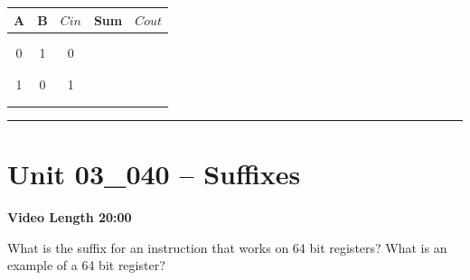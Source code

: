 \documentclass[letterpaper,12pt]{exam}
\newcommand{\unit}{Unit 03}
\begin{document}
\begin{questions}
\begin{samepage}
    \begin{tabular}{|c|c|c|c|c|}
      \hline
      A & B & $C{in}$ & Sum & $C{out}$ \\
      \hline
      \hline
       &  &  &  &  \\
      \hline
       &  &  &  &  \\
      \hline
      0 & 1 & 0 &  &  \\
      \hline
       &  &  &  &  \\
      \hline
       &  &  &  &  \\
      \hline
      1 & 0 & 1 &  &  \\
      \hline
       &  &  &  &  \\
      \hline
       &  &  &  &  \\  
      \hline
      
    \end{tabular}

    \vspace{5mm}
\end{samepage}
\par
  
\rule{0.5\textwidth}{.4pt} %
\section*{\unit\_040 -- Suffixes }
\par{\selectfont\textbf{Video Length 20:00 }}
\begin{samepage}
    \question What is the suffix for an instruction that works on 64 bit registers?  What is an example of a 64 bit register?


\end{samepage}
\end{questions}
\end{document}
